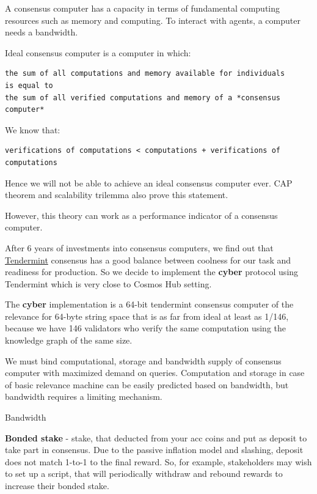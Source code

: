\documentclass[10pt,oneside]{amsart}
\makeatletter
\def\section{\@startsection{section}{1}%
  \z@{.7\linespacing\@plus\linespacing}{.5\linespacing}%
  {\normalfont\scshape}}%
\newcommand{\code}[1]{\textbf{#1}}
\makeatother
\begin{document}
A consensus computer has a capacity in terms of fundamental computing resources such as memory and computing. To interact with agents, a computer needs a bandwidth.

Ideal consensus computer is a computer in which:

\begin{lstlisting}
the sum of all computations and memory available for individuals
is equal to
the sum of all verified computations and memory of a *consensus computer*
\end{lstlisting}

We know that:

\begin{lstlisting}
verifications of computations < computations + verifications of computations
\end{lstlisting}

Hence we will not be able to achieve an ideal consensus computer ever. CAP theorem and scalability trilemma also prove this statement.

However, this theory can work as a performance indicator of a consensus computer.

After 6 years of investments into consensus computers, we find out that \href{https://ipfs.io/ipfs/QmaMtD7xDgghqgjN62zWZ5TBGFiEjGQtuZBjJ9sMh816KJ}{Tendermint} consensus has a good balance between coolness for our task and readiness for production. So we decide to implement the \code{cyber} protocol using Tendermint which is very close to Cosmos Hub setting.

The \code{cyber} implementation is a 64-bit tendermint consensus computer of the relevance for 64-byte string space that is as far from ideal at least as 1/146, because we have 146 validators who verify the same computation using the knowledge graph of the same size.

We must bind computational, storage and bandwidth supply of consensus computer with maximized demand on queries. Computation and storage in case of basic relevance machine can be easily predicted based on bandwidth, but bandwidth requires a limiting mechanism.

\section{Bandwidth}\label{bandwidth}

\code{Bonded stake} - stake, that deducted from your acc coins and put as deposit to take part in consensus. Due to the passive inflation model and slashing, deposit does not match 1-to-1 to the final reward. So, for example, stakeholders may wish to set up a script, that will periodically withdraw and rebound rewards to increase their bonded stake.
\end{document}
